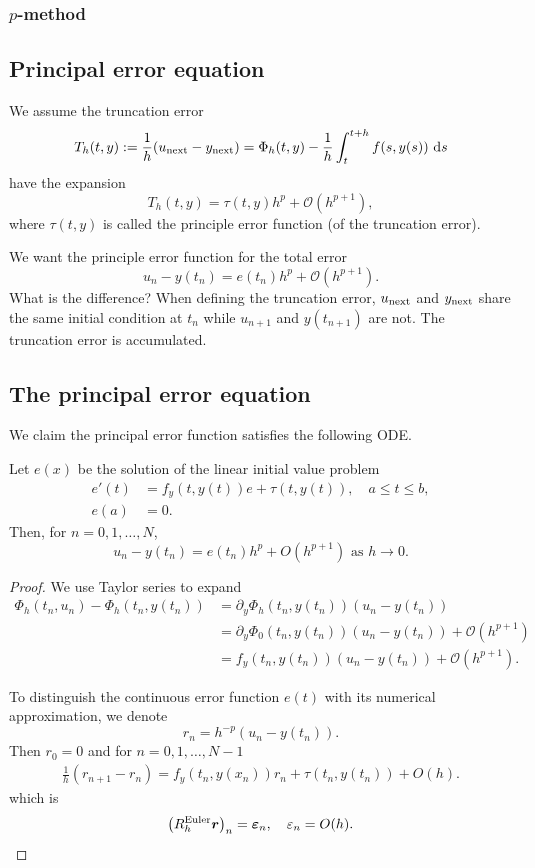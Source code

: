 \documentclass[10pt]{amsart}
\begin{document}
\subsubsection{$p$-method}


\subsection{Principal error equation}
We assume the truncation error
\begin{equation}\label{eq:Tphi}  
T_h(t, y) := \frac{1}{h}(u_{\rm next} - y_{\rm next}) =  \Phi_h(t, y) - \frac{1}{h} \int_{t}^{t+h} f(s, y(s)) \, \,{\rm d} s
\end{equation}  
have the expansion
$$
T_h(t, y) = \tau(t, y) h^p + \mathcal O(h^{p+1}),
$$
where $\tau(t,y)$ is called the principle error function (of the truncation error). 

We want the principle error function for the total error
$$
u_n - y(t_n) = e(t_n) h^p + \mathcal O(h^{p+1}).
$$
What is the difference? When defining the truncation error, $u_{\rm next}$ and $y_{\rm next}$ share the same initial condition at $t_n$ while $u_{n+1}$ and $y(t_{n+1})$ are not. The truncation error is accumulated. 

\subsection{The principal error equation}
We claim the principal error function satisfies the following ODE.
\begin{theorem}
Let $e(x)$ be the solution of the linear initial value problem
$$
\begin{aligned}
e'(t)& =f_y(t, {y}(t)) e+{\tau}(t, {y}(t)), \quad a \leq t \leq b, \\
e(a) & = 0.
\end{aligned}
$$
Then, for $n=0,1, \ldots, N$,
$$
{u}_n-{y}\left(t_n\right)=e\left(t_n\right) h^p+O\left(h^{p+1}\right) \text { as } h \rightarrow 0.
$$
\end{theorem}
\begin{proof}
We use Taylor series to expand
$$
\begin{aligned}
\Phi_h(t_n, u_n) - \Phi_h(t_n, y(t_n)) &= \partial_y\Phi_h(t_n, y(t_n))( u_n - y(t_n))\\
&= \partial_y\Phi_0(t_n, y(t_n))( u_n - y(t_n)) + \mathcal O(h^{p+1})\\
&= f_y(t_n, y(t_n))( u_n - y(t_n)) + \mathcal O(h^{p+1}).
\end{aligned}
$$

To distinguish the continuous error function $e(t)$ with its numerical approximation, we denote
$$
r_n = h^{-p} ({u}_n-{y}\left(t_n\right)). 
$$
Then $r_0 = 0$ and for $n=0,1, \ldots, N-1$
$$
\begin{gathered}
\frac{1}{h}\left(r_{n+1}-r_n\right)=f_y\left(t_n, {y}\left(x_n\right)\right) r_n+{\tau}\left(t_n, {y}\left(t_n\right)\right)+O(h).
\end{gathered}
$$
which is
$$
\left(R_h^{\text {Euler}} \boldsymbol r\right)_n=\boldsymbol{\varepsilon}_n, \quad  \varepsilon_n=O(h).
$$
\end{proof}




 
\end{document}
